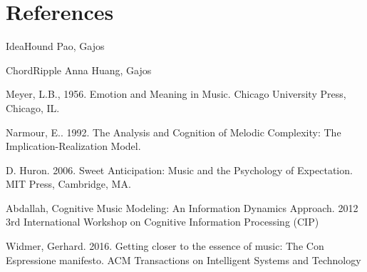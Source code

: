 \documentclass[final,authoryear,5p,times,twocolumn]{elsarticle}
\begin{document}




\section{References}


 
IdeaHound Pao, Gajos

ChordRipple Anna Huang, Gajos

Meyer, L.B., 1956. Emotion and Meaning in Music. Chicago University Press, Chicago, IL.

Narmour, E.. 1992. The Analysis and Cognition of Melodic Complexity: The Implication-Realization Model.

D. Huron. 2006. Sweet Anticipation: Music and the Psychology of Expectation. MIT Press, Cambridge, MA.

Abdallah, Cognitive Music Modeling: An Information Dynamics Approach. 2012 3rd International Workshop on Cognitive Information Processing (CIP)

Widmer, Gerhard. 2016. Getting closer to the essence of music: The Con Espressione manifesto. ACM Transactions on Intelligent Systems and Technology
\end{document}
